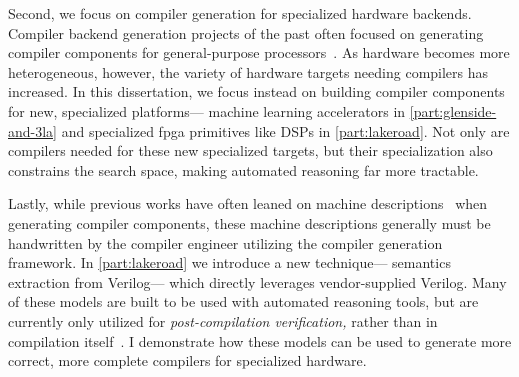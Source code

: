   

Second, we focus on
  compiler generation
  for specialized hardware backends.
Compiler backend generation projects
  of the past often focused on
  generating compiler components
  for general-purpose processors~\cite{
  fauth1995describing,
  leupers1997retargetable,
  brandner2007compiler,
  brandner2009automatic,
  brandner2013automatic,
  ramsey2003pragmatic,
  ramsey2011resourceable,
  dias2010automatically}.
As hardware becomes more heterogeneous,
  however,
  the variety of hardware targets
  needing compilers
  has increased.
In this dissertation,
  we focus instead on 
  building compiler components
  for new, specialized platforms---%
  machine learning accelerators
  in \cref{part:glenside-and-3la}
  and specialized \gls{fpga} \glspl{primitive}
  like DSPs in
  \cref{part:lakeroad}.
Not only are compilers
  needed for these new specialized targets,
  but their specialization
  also constrains the search space,
  making automated reasoning
  far more tractable.


Lastly,
  while previous works have often leaned
  on machine descriptions~\cite{
  ramsey2011resourceable}
  when generating compiler components,
  these machine descriptions
  generally must be handwritten
  by the compiler engineer
  utilizing the compiler generation
  framework.
In \cref{part:lakeroad}
  we introduce a new technique---%
  semantics extraction from Verilog---%
  which directly leverages vendor-supplied
  Verilog.
Many of these models are
  built to be used with
  automated reasoning tools,
  but are currently only utilized for
  \textit{post-compilation verification,}
  rather than in compilation itself~\cite{sisco2022position,sisco2022synthesis}.
I demonstrate how these models
  can be used
  to generate more correct, more complete compilers
  for specialized hardware.

